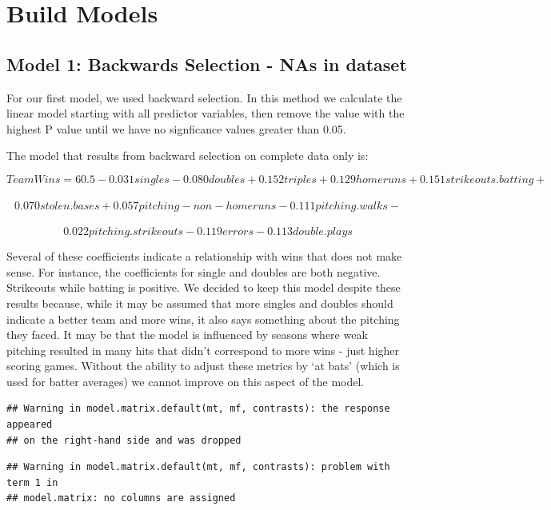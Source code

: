 \documentclass[]{article}
\begin{document}
\section{Build Models}\label{build-models}

\subsection{Model 1: Backwards Selection - NAs in
dataset}\label{model-1-backwards-selection---nas-in-dataset}

For our first model, we used backward selection. In this method we
calculate the linear model starting with all predictor variables, then
remove the value with the highest P value until we have no signficance
values greater than 0.05.

The model that results from backward selection on complete data only is:

\[Team Wins = 60.5 - 0.031singles - 0.080doubles + 0.152triples + 0.129homeruns + 0.151strikeouts.batting + \]\\
\[ 0.070stolen.bases + 0.057pitching-non-homeruns - 0.111pitching.walks - \]\\
\[ 0.022pitching.strikeouts - 0.119errors - 0.113double.plays\]

Several of these coefficients indicate a relationship with wins that
does not make sense. For instance, the coefficients for single and
doubles are both negative. Strikeouts while batting is positive. We
decided to keep this model despite these results because, while it may
be assumed that more singles and doubles should indicate a better team
and more wins, it also says something about the pitching they faced. It
may be that the model is influenced by seasons where weak pitching
resulted in many hits that didn't correspond to more wins - just higher
scoring games. Without the ability to adjust these metrics by `at bats'
(which is used for batter averages) we cannot improve on this aspect of
the model.

\begin{verbatim}
## Warning in model.matrix.default(mt, mf, contrasts): the response appeared
## on the right-hand side and was dropped
\end{verbatim}

\begin{verbatim}
## Warning in model.matrix.default(mt, mf, contrasts): problem with term 1 in
## model.matrix: no columns are assigned
\end{verbatim}
\end{document}
